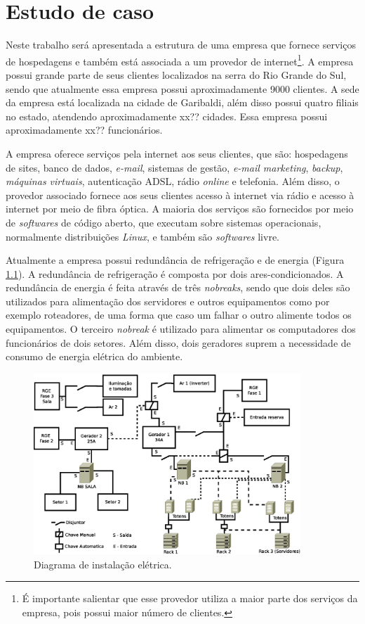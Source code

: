 \chapter{Estudo de caso}
\label{cap:estudodecaso}

Neste trabalho será apresentada a estrutura de uma empresa que fornece serviços de hospedagens e também está associada a um provedor de 
internet\footnote{É importante salientar que esse provedor utiliza a maior parte dos serviços da empresa, pois possui maior número de clientes.}. 
A empresa possui grande parte de seus clientes localizados na serra do Rio Grande do Sul, sendo que atualmente essa empresa possui 
aproximadamente 9000 clientes. A sede da empresa está localizada na cidade de Garibaldi, além disso possui quatro filiais no estado, 
atendendo aproximadamente xx?? cidades. Essa empresa possui aproximadamente xx?? funcionários.

A empresa oferece serviços pela internet aos seus clientes, que são: hospedagens de sites, banco de dados, \textit{e-mail}, sistemas de gestão, 
\textit{e-mail marketing}, \textit{backup}, \textit{máquinas virtuais}, autenticação \ac{ADSL}, rádio \textit{online} e telefonia.
Além disso, o provedor associado fornece aos seus clientes acesso à internet via rádio e acesso à internet por meio de fibra óptica.
A maioria dos serviços são fornecidos por meio de \textit{softwares} de código aberto, que executam sobre sistemas operacionais, normalmente 
distribuições \textit{Linux}, e também são \textit{softwares} livre.

Atualmente a empresa possui redundância de refrigeração e de energia (Figura \ref{fig:insteletrica}). A redundância de refrigeração é composta 
por dois ares-condicionados. 
A redundância de energia é feita através de três \textit{nobreaks}, sendo que dois deles são utilizados para alimentação dos servidores e outros 
equipamentos como por exemplo roteadores, de uma forma que caso um falhar o outro alimente todos os equipamentos. O terceiro \textit{nobreak} é 
utilizado para alimentar os computadores dos funcionários de dois setores. Além disso, dois geradores suprem a necessidade de consumo de 
energia elétrica do ambiente.

\begin{figure}[h!]
 \centering
 \includegraphics[width=380px]{img/insteletrica.eps}
 \caption{Diagrama de instalação elétrica.}
 \label{fig:insteletrica}
\end{figure}

